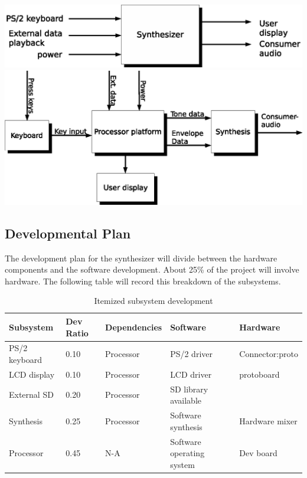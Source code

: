 \documentclass[bibtotocnumbered,abstract=on,paper=a4,fontsize=12pt,parskip=on,halfparskip=on]{scrartcl}		%
\begin{document}
      \begin{center}
      \vskip 1cm
        \centering
          \includegraphics[width=\linewidth]{img/fig_level0}
      \vskip 1cm
        \centering
          \includegraphics[width=\linewidth]{img/fig_level1}
      \vskip 1cm
      \end{center}
  \subsection{Developmental Plan}
    The development plan for the synthesizer will divide between the hardware components and the software development. About 25\% of the project will involve hardware. The following table will record this breakdown of the subsystems.\\
    \begin{table}[H]
    \caption{Itemized subsystem development}
    \vskip 0.3cm
    \small
    \begin{tabularx}{\linewidth}{  l p{2.1cm} l X X }
      \textbf{Subsystem} & \textbf{Dev Ratio} & \textbf{Dependencies} & \textbf{Software} & \textbf{Hardware}\\
      \hline
      PS/2 keyboard & 0.10 & Processor & PS/2 driver & Connector:proto\\
      LCD display & 0.10 & Processor & LCD driver & protoboard\\
      External SD & 0.20 & Processor & SD library available & \\
      Synthesis & 0.25 & Processor & Software synthesis & Hardware mixer\\
      Processor & 0.45 & N-A & Software operating system & Dev board\\
    \end{tabularx}
    \end{table}
\end{document}
